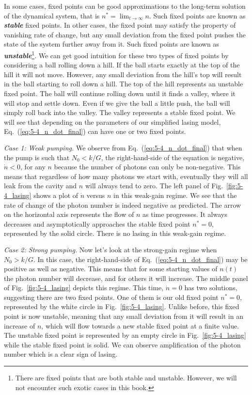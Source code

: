 In some cases, fixed points can be good approximations to the long-term solution of the dynamical system, that is $n^* = \lim_{t\rightarrow\infty} n$.
Such fixed points are known as \textbf{\emph{stable}} fixed points.
In other cases, the fixed point may satisfy the property of vanishing rate of change, but any small deviation from the fixed point pushes the state of the system further away from it.
Such fixed points are known as \textbf{\emph{unstable}}\footnote{There are fixed points that are both stable and unstable. However, we will not encounter such exotic cases in this book.}.
We can get good intuition for these two types of fixed points by considering a ball rolling down a hill.
If the ball starts exactly at the top of the hill it will not move.
However, any small deviation from the hill's top will result in the ball starting to roll down a hill.
The top of the hill represents an unstable fixed point.
The ball will continue rolling down until it finds a valley, where it will stop and settle down.
Even if we give the ball a little push, the ball will simply roll back into the valley.
The valley represents a stable fixed point.
We will see that depending on the parameters of our simplified lasing model, Eq.~(\ref{eq:5-4_n_dot_final}) can have one or two fixed points.

\emph{Case 1: Weak pumping.}
We observe from Eq.~(\ref{eq:5-4_n_dot_final}) that when the pump is such that $N_0 < k / G$, the right-hand-side of the equation is negative, $\dot{n} < 0$, for any $n$ because the number of photons can only be non-negative.
This means that regardless of how many photons we start with, eventually they will all leak from the cavity and $n$ will always tend to zero.
The left panel of Fig.~\ref{fig:5-4_lasing} shows a plot of $\dot{n}$ versus $n$ in this weak-gain regime.
We see that the rate of change of the photon number is indeed negative as predicted.
The arrow on the horizontal axis represents the flow of $n$ as time progresses.
It always decreases and asymptotically approaches the stable fixed point $n^* = 0$, represented by the solid circle.
There is no lasing in this weak-gain regime.

\emph{Case 2: Strong pumping.}
Now let's look at the strong-gain regime when $N_0 > k / G$.
In this case, the right-hand-side of Eq.~(\ref{eq:5-4_n_dot_final}) may be positive as well as negative.
This means that for some starting values of $n(t)$ the photon number will decrease, and for others it will increase.
The middle panel of Fig.~\ref{fig:5-4_lasing} depicts this regime.
This time, $\dot{n} = 0$ has two solutions, suggesting there are two fixed points.
One of them is our old fixed point $n^*=0$, represented by the white circle in Fig.~\ref{fig:5-4_lasing}.
Unlike before, this fixed point is now unstable, meaning that any small deviation from it will result in an increase of $n$, which will flow towards a new stable fixed point at a finite value.
The unstable fixed point is represented by an empty circle in Fig.~\ref{fig:5-4_lasing} while the stable fixed point is solid.
We can observe amplification of the photon number which is a clear sign of lasing.

